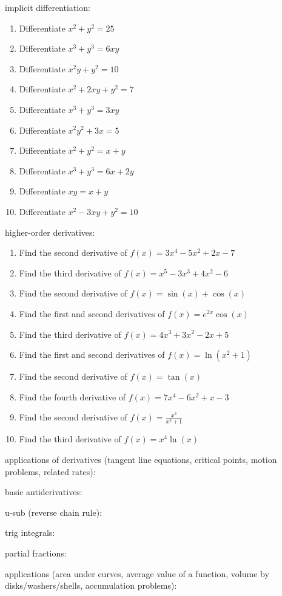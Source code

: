 \documentclass{article}
\begin{document}
implicit differentiation:
\begin{enumerate}
        \item Differentiate $x^2 + y^2 = 25$
        \item Differentiate $x^3 + y^3 = 6xy$
        \item Differentiate $x^2y + y^2 = 10$
        \item Differentiate $x^2 + 2xy + y^2 = 7$
        \item Differentiate $x^3 + y^3 = 3xy$
        \item Differentiate $x^2y^2 + 3x = 5$
        \item Differentiate $x^2 + y^2 = x + y$
        \item Differentiate $x^3 + y^3 = 6x + 2y$
        \item Differentiate $xy = x + y$
        \item Differentiate $x^2 - 3xy + y^2 = 10$
\end{enumerate}

higher-order derivatives:
\begin{enumerate}
        \item Find the second derivative of $f(x) = 3x^4 - 5x^2 + 2x - 7$
        \item Find the third derivative of $f(x) = x^5 - 3x^3 + 4x^2 - 6$
        \item Find the second derivative of $f(x) = \sin(x) + \cos(x)$
        \item Find the first and second derivatives of $f(x) = e^{2x} \cos(x)$
        \item Find the third derivative of $f(x) = 4x^3 + 3x^2 - 2x + 5$
        \item Find the first and second derivatives of $f(x) = \ln(x^2 + 1)$
        \item Find the second derivative of $f(x) = \tan(x)$
        \item Find the fourth derivative of $f(x) = 7x^4 - 6x^2 + x - 3$
        \item Find the second derivative of $f(x) = \frac{x^3}{x^2 + 1}$
        \item Find the third derivative of $f(x) = x^4 \ln(x)$
\end{enumerate}

applications of derivatives (tangent line equations, critical points, motion problems, related rates):

basic antiderivatives:

u-sub (reverse chain rule):

trig integrals:

partial fractions:

applications (area under curves, average value of a function, volume by disks/washers/shells, accumulation problems):
\end{document}
